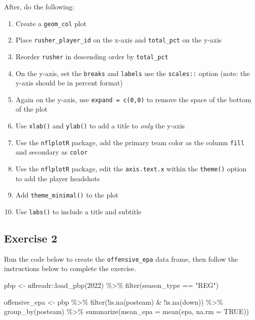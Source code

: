\documentclass[
  letterpaper,
]{krantz}
\newenvironment{Shaded}{\begin{snugshade}}{\end{snugshade}}
\newcommand{\AttributeTok}[1]{\textcolor[rgb]{0.40,0.45,0.13}{#1}}
\newcommand{\ConstantTok}[1]{\textcolor[rgb]{0.56,0.35,0.01}{#1}}
\newcommand{\DecValTok}[1]{\textcolor[rgb]{0.68,0.00,0.00}{#1}}
\newcommand{\FunctionTok}[1]{\textcolor[rgb]{0.28,0.35,0.67}{#1}}
\newcommand{\NormalTok}[1]{\textcolor[rgb]{0.00,0.23,0.31}{#1}}
\newcommand{\OtherTok}[1]{\textcolor[rgb]{0.00,0.23,0.31}{#1}}
\newcommand{\SpecialCharTok}[1]{\textcolor[rgb]{0.37,0.37,0.37}{#1}}
\newcommand{\StringTok}[1]{\textcolor[rgb]{0.13,0.47,0.30}{#1}}
\providecommand{\tightlist}{%
  \setlength{\itemsep}{0pt}\setlength{\parskip}{0pt}}\usepackage{longtable,booktabs,array}
\begin{document}
After, do the following:

\begin{enumerate}
\def\labelenumi{\arabic{enumi}.}
\tightlist
\item
  Create a \texttt{geom\_col} plot
\item
  Place \texttt{rusher\_player\_id} on the x-axis and
  \texttt{total\_pct} on the y-axis
\item
  Reorder \texttt{rusher} in descending order by \texttt{total\_pct}
\item
  On the y-axis, set the \texttt{breaks} and \texttt{labels} use the
  \texttt{scales::} option (note: the y-axis should be in percent
  format)
\item
  Again on the y-axis, use \texttt{expand\ =\ c(0,0)} to remove the
  space of the bottom of the plot
\item
  Use \texttt{xlab()} and \texttt{ylab()} to add a title to \emph{only}
  the y-axis
\item
  Use the \texttt{nflplotR} package, add the primary team color as the
  column \texttt{fill} and secondary as \texttt{color}
\item
  Use the \texttt{nflplotR} package, edit the \texttt{axis.text.x}
  within the \texttt{theme()} option to add the player headshots
\item
  Add \texttt{theme\_minimal()} to the plot
\item
  Use \texttt{labs()} to include a title and subtitle
\end{enumerate}

\hypertarget{exercise-2-2}{%
\subsection{Exercise 2}\label{exercise-2-2}}

Run the code below to create the \texttt{offensive\_epa} data frame,
then follow the instructions below to complete the exercise.

\begin{Shaded}
\begin{Highlighting}[]
\NormalTok{pbp }\OtherTok{\textless{}{-}}\NormalTok{ nflreadr}\SpecialCharTok{::}\FunctionTok{load\_pbp}\NormalTok{(}\DecValTok{2022}\NormalTok{) }\SpecialCharTok{\%\textgreater{}\%}
  \FunctionTok{filter}\NormalTok{(season\_type }\SpecialCharTok{==} \StringTok{"REG"}\NormalTok{)}

\NormalTok{offensive\_epa }\OtherTok{\textless{}{-}}\NormalTok{ pbp }\SpecialCharTok{\%\textgreater{}\%}
  \FunctionTok{filter}\NormalTok{(}\SpecialCharTok{!}\FunctionTok{is.na}\NormalTok{(posteam) }\SpecialCharTok{\&} \SpecialCharTok{!}\FunctionTok{is.na}\NormalTok{(down)) }\SpecialCharTok{\%\textgreater{}\%}
  \FunctionTok{group\_by}\NormalTok{(posteam) }\SpecialCharTok{\%\textgreater{}\%}
  \FunctionTok{summarize}\NormalTok{(}\AttributeTok{mean\_epa =} \FunctionTok{mean}\NormalTok{(epa, }\AttributeTok{na.rm =} \ConstantTok{TRUE}\NormalTok{))}
\end{Highlighting}
\end{Shaded}
\end{document}
